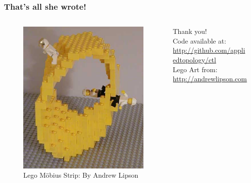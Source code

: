 \documentclass{beamer}
\begin{document}

\begin{frame}
\frametitle{That's all she wrote!}
\begin{columns}
	\begin{column}{.4\textwidth}
	\begin{figure}
		\includegraphics[width=\textwidth]{mobiusmen.jpg}
		\caption{Lego M\"obius Strip: By Andrew Lipson}
	\end{figure}
\end{column}
\begin{column}{.7\textwidth}
Thank you!  \\
Code available at: \\
\url{http://github.com/appliedtopology/ctl}  \\
\vspace{1cm}
Lego Art from: \\ 
\url{http://andrewlipson.com}
\end{column}
\end{columns}
\end{frame}
\end{document}
